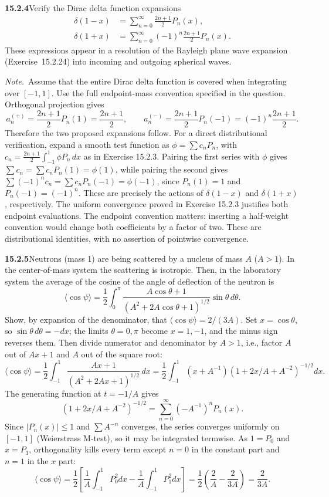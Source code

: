 \par\bigskip
\noindent\textbf{15.2.4}\quad Verify the Dirac delta function
expansions 
\begin{align*}
\delta(1-x)&=\sum_{n=0}^{\infty}\frac{2n+1}{2}P_{n}(x),\\
\delta(1+x)&=\sum_{n=0}^{\infty}(-1)^{n}\frac{2n+1}{2}P_{n}(x).
\end{align*}
These expressions appear in a resolution of the Rayleigh plane wave
expansion (Exercise~15.2.24) into incoming and outgoing spherical
waves.
\par\emph{Note.}~Assume that the entire Dirac delta function is
covered when integrating over $[-1,1]$.
\solution
Use the full endpoint-mass convention specified in the question.
Orthogonal projection gives
\[
a_n^{(+)}=\frac{2n+1}{2}P_n(1)=\frac{2n+1}{2},\qquad
a_n^{(-)}=\frac{2n+1}{2}P_n(-1)=(-1)^n\frac{2n+1}{2}.
\]
Therefore the two proposed expansions follow.
For a direct distributional verification, expand a smooth test
function as $\phi=\sum c_nP_n$, with
$c_n=\frac{2n+1}2\int_{-1}^1\phi P_n\,dx$ as in Exercise 15.2.3.
Pairing the first series with $\phi$ gives
$\sum c_n=\sum c_nP_n(1)=\phi(1)$, while pairing the second gives
$\sum(-1)^nc_n=\sum c_nP_n(-1)=\phi(-1)$, since $P_n(1)=1$ and
$P_n(-1)=(-1)^n$. These are precisely the actions of
$\delta(1-x)$ and $\delta(1+x)$, respectively. The uniform convergence proved in Exercise 15.2.3
justifies both endpoint evaluations.
The endpoint convention matters: inserting a half-weight convention
would change both coefficients by a factor of two. These are
distributional identities, with no assertion of pointwise convergence.

\par\bigskip
\noindent\textbf{15.2.5}\quad Neutrons (mass 1) are being scattered by
a nucleus of mass $A$ ($A>1$). In the center-of-mass system the
scattering is isotropic. Then, in the laboratory system the average of
the cosine of the angle of deflection of the neutron is
\[
\langle\cos\psi\rangle=\frac{1}{2}\int_{0}^{\pi}
\frac{A\cos\theta+1}{(A^{2}+2A\cos\theta+1)^{1/2}}\sin\theta\,d\theta.
\]
Show, by expansion of the denominator, that
$\langle\cos\psi\rangle=2/(3A)$.
\solution
Set $x=\cos\theta$, so $\sin\theta\,d\theta=-dx$; the limits
$\theta=0,\pi$ become $x=1,-1$, and the minus sign reverses them.
Then divide numerator and denominator by $A>1$, i.e., factor
$A$ out of $Ax+1$ and $A$ out of the square root:
\[
\langle\cos\psi\rangle
=\frac12\int_{-1}^1\frac{Ax+1}{(A^2+2Ax+1)^{1/2}}\,dx
=\frac12\int_{-1}^1(x+A^{-1})
(1+2x/A+A^{-2})^{-1/2}dx.
\]
The generating function at $t=-1/A$ gives
\[
(1+2x/A+A^{-2})^{-1/2}
=\sum_{n=0}^\infty(-A^{-1})^nP_n(x).
\]
Since $|P_n(x)|\le1$ and $\sum A^{-n}$ converges, the series converges
uniformly on $[-1,1]$ (Weierstrass M-test), so it may be integrated
termwise. As $1=P_0$ and $x=P_1$, orthogonality kills every term
except $n=0$ in the constant part and $n=1$ in the $x$ part:
\[
\langle\cos\psi\rangle
=\frac12\left[\frac1A\int_{-1}^1P_0^2dx
-\frac1A\int_{-1}^1P_1^2dx\right]
=\frac12\left(\frac2A-\frac2{3A}\right)
=\boxed{\frac2{3A}}.
\]

